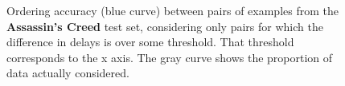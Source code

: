 \documentclass[10pt,a4paper,notitlepage,twocolumn]{article}
\begin{document}
\begin{figure}[p]
\caption{Ordering accuracy (blue curve) between pairs of examples from the {\bf
Assassin's Creed} test set, considering only pairs for which the difference
in delays is over some threshold. That threshold corresponds to the
x axis. The gray curve shows the proportion of data actually
considered.}
\label{fig:oa_ac}
\end{figure}
\end{document}
